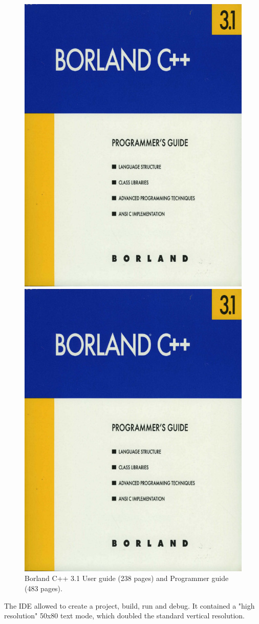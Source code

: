 \documentclass[book.tex]{subfiles}
\begin{document}
\par
\begin{figure}[H]
\centering
\begin{minipage}{.5\textwidth}
  \centering
  \includegraphics[width=.5\linewidth]{screenshots_300dpi/borland_programmer_guide.png}
\end{minipage}%
\begin{minipage}{.5\textwidth}
  \centering
  \includegraphics[width=.5\linewidth]{screenshots_300dpi/borland_programmer_guide.png}
\end{minipage}
\caption{Borland C++ 3.1 User guide (238 pages) and Programmer guide (483 pages).}
\end{figure}

\par
The IDE allowed to create a project, build, run and debug. It contained a "high resolution" 50x80 text mode, which doubled the standard vertical resolution.\\
\par
\par
\vspace{-35pt}  
\end{document}
